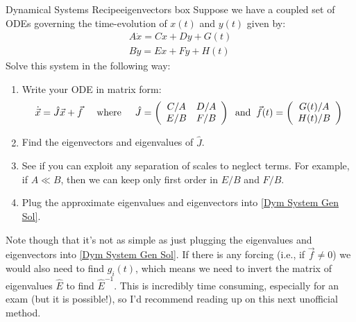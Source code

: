 \begin{fact}{Dynamical Systems Recipe}{eigenvectors box}\label{eigenvectors box}
    Suppose we have a coupled set of ODEs governing the time-evolution of $x(t)$ and $y(t)$ given by:
    \begin{align*}
        A \dot{x}= Cx + Dy + G(t)\\
        B \dot{y} = Ex + Fy + H(t)
    \end{align*}
    Solve this system in the following way:
    \begin{enumerate}
        \item Write your ODE in matrix form:
            \begin{align*}
                \dot{\vec{x}}=\hat{J}\vec{x}+\vec{f} \hspace{5 mm}\text{where} \hspace{5 mm}\hat{J} = \left( \begin{array}{cc}
                    C/A & D/A \\
                    E/B & F/B
                \end{array} \right)
                \hspace{2 mm}\text{and} \hspace{2 mm}
                \vec{f}(t)=\left( \begin{array}{c}
                    G(t)/A \\
                    H(t)/B
                \end{array} \right)
            \end{align*}
        \item Find the eigenvectors and eigenvalues of $\hat{J}$.
        \item See if you can exploit any separation of scales to neglect terms. For example, if $A\ll B$, then we can keep only first order in $E/B$ and $F/B$. 
        \item Plug the approximate eigenvalues and eigenvectors into \ref{Dym System Gen Sol}.
    \end{enumerate}
\end{fact}

Note though that it's not as simple as just plugging the eigenvalues and eigenvectors into \ref{Dym System Gen Sol}. If there is any forcing (i.e., if $\vec{f}\neq 0$) we would also need to find $g_i(t)$, which means we need to invert the matrix of eigenvalues $\hat{E}$ to find $\hat{E}^{-1}$. This is incredibly time consuming, especially for an exam (but it is possible!), so I'd recommend reading up on this next unofficial method.

